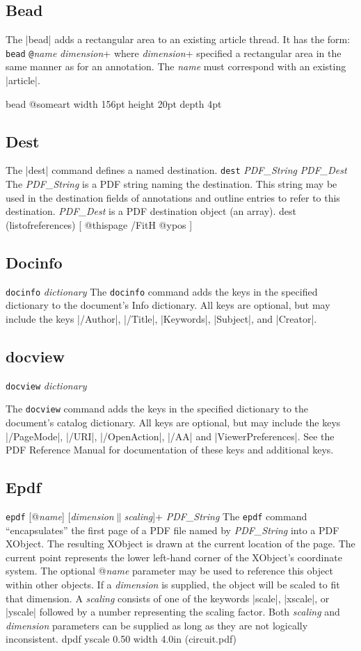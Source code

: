 {\subsection{Bead}
The |bead| adds a rectangular area to an existing article thread.
It has the form:
\beginlist
{\tt bead} {\tt @}{\it name} {\it dimension}+
\endlist
where {\it dimension}+ specified a rectangular area
in the same manner as for an annotation.  The {\it name}
must correspond with an existing |article|.

\begintt
bead @someart width 156pt height 20pt \space depth 4pt 
\endtt
\subsection{Dest}
The |dest| command defines a named destination.
\beginlist
{\tt dest} {\it PDF\_String} {\it PDF\_Dest}
\endlist
The {\it PDF\_String} is a PDF string naming
the destination.  This string may be used in the destination
fields of annotations and outline entries to refer to
this destination.  {\it PDF\_Dest} is a PDF
destination object (an array).
\begintt
dest (listofreferences) [ @thispage /FitH @ypos ]
\endtt

\subsection{Docinfo}
\beginlist
{\tt docinfo} {\it dictionary}
\endlist
The {\tt docinfo} command adds the keys in the specified dictionary to the
document's Info dictionary.  All keys are optional, but may include
the keys |/Author|, |/Title|, |Keywords|, |Subject|,
and |Creator|.
\subsection{docview}
\beginlist
{\tt docview} {\it dictionary}
\endlist

The {\tt docview} command adds the keys in the specified dictionary to the
document's catalog dictionary.  All keys are optional, but may include
the keys |/PageMode|,
|/URI|, |/OpenAction|, |/AA|
and |ViewerPreferences|.  See the PDF Reference Manual
for documentation of these keys and additional keys.
\subsection{Epdf}
\beginlist
{\tt epdf} [@{\it name}] [{\it dimension}$\|${\it scaling}]+
 {\it PDF\_String}
\endlist
The {\tt epdf} command ``encapsulates'' the first page of a PDF
file named by {\it PDF\_String}
into a PDF XObject.  The resulting XObject is drawn
at the current location of the page.  The current point
represents the lower left-hand corner of the XObject's coordinate
system.  The optional @{\it name} parameter may be used
to reference this object within other objects.  If a
{\it dimension} is supplied, the object will be scaled to fit
that dimension.  A {\it scaling} consists of one of the keywords
|scale|, |xscale|, or |yscale| followed by a number representing
the scaling factor.  Both {\it scaling} and {\it dimension}
parameters can be supplied as long as they are not logically
inconsistent.
\begintt
dpdf yscale 0.50 width 4.0in (circuit.pdf)
\endtt
}
